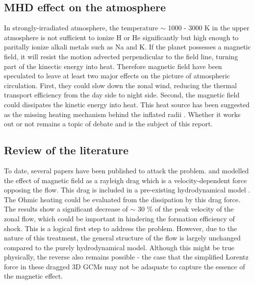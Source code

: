 \documentclass[11pt]{article}
\begin{document}
\subsection{MHD effect on the atmosphere}

In strongly-irradiated atmosphere, the temperature $\sim$ 1000 - 3000 K in the upper atmosphere is not sufficient to ionize H or He significantly but high enough to paritally ionize alkali metals such as Na and K. If the planet possesses a magnetic field, it will resist the motion advected perpendicular to the field line, turning part of the kinectic energy into heat. Therefore magnetic field have been speculated to leave at least two major effects on the picture of atmospheric circulation. First, they could slow down the zonal wind, reducing the thermal transport efficiency from the day side to night side. Second, the magnetic field could dissipates the kinetic energy into heat. This heat source has been suggested as the missing heating mechanism behind the inflated radii \citep{batygin2010inflating}. Whether it works out or not remains a topic of debate and is the subject of this report.


\subsection{Review of the literature}

To date, several papers have been published to attack the problem. \citet*{perna2010a,perna2010b} and \citet*{rauscher2013} modelled the effect of magnetic field as a rayleigh drag which is a velocity-dependent force opposing the flow. This drag is included in a pre-existing hydrodynamical model \citep{rauscher2010three}. The Ohmic heating could be evaluated from the dissipation by this drag force. The results show a significant decrease  of $\sim$ 30 \% of the peak velocity of the zonal flow, which could be important in hindering the formation efficiency of shock. This is a logical first step to address the problem. However, due to the nature of this treatment, the general structure of the flow is largely unchanged compared to the purely hydrodynamical model. Although this might be true physically, the reverse also remains possible - the case that the simplified Lorentz force in these dragged 3D GCMs may not be adaquate to capture the essence of the magnetic effect. 
\end{document}
